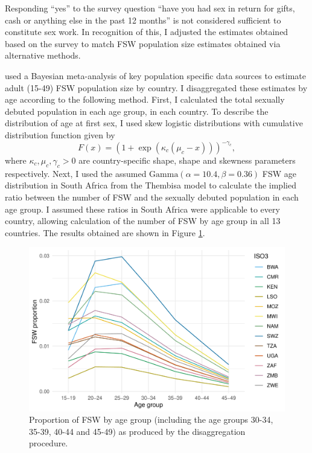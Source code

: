 \documentclass[a4paper, nobind]{templates/ociamthesis}
\begin{document}
Responding ``yes'' to the survey question ``have you had sex in return for gifts, cash or anything else in the past 12 months'' is not considered sufficient to constitute sex work.
In recognition of this, I adjusted the estimates obtained based on the survey to match FSW population size estimates obtained via alternative methods.

\textcite{stevens2022estimating} used a Bayesian meta-analysis of key population specific data sources to estimate adult (15-49) FSW population size by country.
I disaggregated these estimates by age according to the following method.
First, I calculated the total sexually debuted population in each age group, in each country.
To describe the distribution of age at first sex, I used skew logistic distributions \autocite{nguyen2022trends} with cumulative distribution function given by
\begin{equation}
F(x) = \left(1 + \exp(\kappa_c (\mu_c - x)) \right)^{- \gamma_c},
\end{equation}
where \(\kappa_c, \mu_c, \gamma_c > 0\) are country-specific shape, shape and skewness parameters respectively.
Next, I used the assumed \(\text{Gamma}(\alpha = 10.4, \beta = 0.36)\) FSW age distribution in South Africa from the Thembisa model \autocite{johnson2020thembisa} to calculate the implied ratio between the number of FSW and the sexually debuted population in each age group.
I assumed these ratios in South Africa were applicable to every country, allowing calculation of the number of FSW by age group in all 13 countries.
The results obtained are shown in Figure \ref{fig:age-disagg-fsw-line}.

\begin{figure}
\includegraphics[width=0.9\linewidth]{figures/multi-agyw/age-disagg-fsw-line} \caption{Proportion of FSW by age group (including the age groups 30-34, 35-39, 40-44 and 45-49) as produced by the disaggregation procedure.}\label{fig:age-disagg-fsw-line}
\end{figure}
\end{document}
